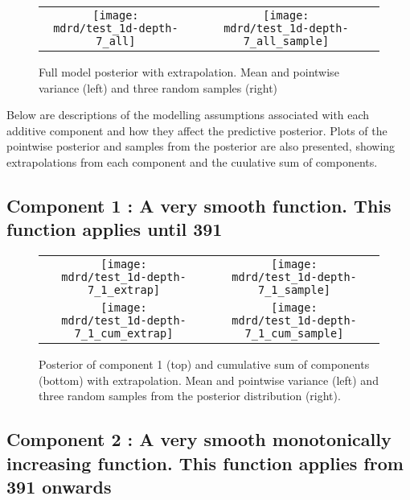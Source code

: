 \documentclass{article} %
\begin{document}
\begin{figure}[H]
\newcommand{\wmgd}{0.5\columnwidth}
\newcommand{\hmgd}{3.0cm}
\newcommand{\mdrd}{test_1d-depth-7}
\newcommand{\mbm}{\hspace{-0.3cm}}
\begin{tabular}{cc}
\mbm \texttt{[image: \\mdrd/test\_1d-depth-7\_all]} & \texttt{[image: \\mdrd/test\_1d-depth-7\_all\_sample]}
\end{tabular}
\caption{Full model posterior with extrapolation. Mean and pointwise variance (left) and three random samples (right)}
\label{fig:extrap}
\end{figure}

Below are descriptions of the modelling assumptions associated with each additive component and how they affect the predictive posterior.
Plots of the pointwise posterior and samples from the posterior are also presented, showing extrapolations from each component and the cuulative sum of components.

\subsection{Component 1 : A very smooth function. This function applies until  391}



\begin{figure}[H]
\newcommand{\wmgd}{0.5\columnwidth}
\newcommand{\hmgd}{3.0cm}
\newcommand{\mdrd}{test_1d-depth-7}
\newcommand{\mbm}{\hspace{-0.3cm}}
\begin{tabular}{cc}
\mbm \texttt{[image: \\mdrd/test\_1d-depth-7\_1\_extrap]} & \texttt{[image: \\mdrd/test\_1d-depth-7\_1\_sample]} \\
\mbm \texttt{[image: \\mdrd/test\_1d-depth-7\_1\_cum\_extrap]} & \texttt{[image: \\mdrd/test\_1d-depth-7\_1\_cum\_sample]}
\end{tabular}
\caption{Posterior of component 1 (top) and cumulative sum of components (bottom) with extrapolation. Mean and pointwise variance (left) and three random samples from the posterior distribution (right).}
\label{fig:extrap1}
\end{figure}

\subsection{Component 2 : A very smooth monotonically increasing function. This function applies from  391 onwards}
\end{document}
